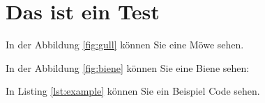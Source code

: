 \chapter{Das ist ein Test}

In der Abbildung \ref{fig:gull} können Sie eine Möwe sehen.


In der Abbildung \ref{fig:biene} können Sie eine Biene sehen:


In Listing \ref{lst:example} können Sie ein Beispiel Code sehen.



\Blinddocument

\Blinddocument
